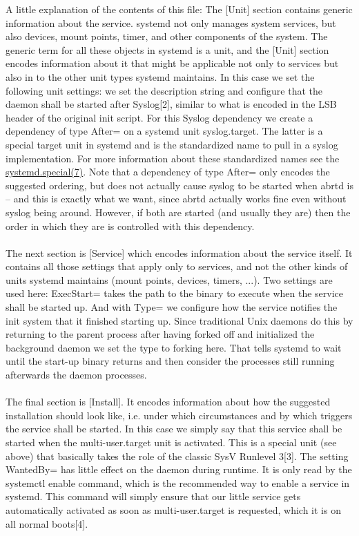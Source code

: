 \documentclass[titlepage]{article}
\begin{document}
A little explanation of the contents of this file: The [Unit] section contains generic information about the service. systemd not only manages system services, but also devices, mount points, timer, and other components of the system. The generic term for all these objects in systemd is a unit, and the [Unit] section encodes information about it that might be applicable not only to services but also in to the other unit types systemd maintains. In this case we set the following unit settings: we set the description string and configure that the daemon shall be started after Syslog[2], similar to what is encoded in the LSB header of the original init script. For this Syslog dependency we create a dependency of type After= on a systemd unit syslog.target. The latter is a special target unit in systemd and is the standardized name to pull in a syslog implementation. For more information about these standardized names see the \href{https://0pointer.de/public/systemd-man/systemd.special.html}{systemd.special(7)}. Note that a dependency of type After= only encodes the suggested ordering, but does not actually cause syslog to be started when abrtd is -- and this is exactly what we want, since abrtd actually works fine even without syslog being around. However, if both are started (and usually they are) then the order in which they are is controlled with this dependency.
\\
\\
The next section is [Service] which encodes information about the service itself. It contains all those settings that apply only to services, and not the other kinds of units systemd maintains (mount points, devices, timers, ...). Two settings are used here: ExecStart= takes the path to the binary to execute when the service shall be started up. And with Type= we configure how the service notifies the init system that it finished starting up. Since traditional Unix daemons do this by returning to the parent process after having forked off and initialized the background daemon we set the type to forking here. That tells systemd to wait until the start-up binary returns and then consider the processes still running afterwards the daemon processes.
\\
\\
The final section is [Install]. It encodes information about how the suggested installation should look like, i.e. under which circumstances and by which triggers the service shall be started. In this case we simply say that this service shall be started when the multi-user.target unit is activated. This is a special unit (see above) that basically takes the role of the classic SysV Runlevel 3[3]. The setting WantedBy= has little effect on the daemon during runtime. It is only read by the systemctl enable command, which is the recommended way to enable a service in systemd. This command will simply ensure that our little service gets automatically activated as soon as multi-user.target is requested, which it is on all normal boots[4].
\end{document}
